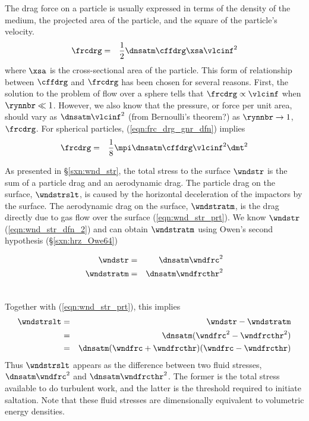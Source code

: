 \documentclass[12pt,twoside]{book}
\begin{document}
The drag force on a particle is usually expressed in terms of the
density of the medium, the projected area of the particle, and the
square of the particle's velocity.
\begin{eqnarray}
\frcdrg & = & \frac{1}{2} \dnsatm \cffdrg \xsa \vlcinf^{2}
\label{eqn:frc_drg_gnr_dfn}
\end{eqnarray}
where $\xsa$ is the cross-sectional area of the particle.
This form of relationship between $\cffdrg$ and $\frcdrg$ has been
chosen for several reasons. 
First, the solution to the problem of flow over a sphere tells that
$\frcdrg \propto \vlcinf$ when $\rynnbr \ll 1$.
However, we also know that the pressure, or force per unit area, 
should vary as $\dnsatm \vlcinf^{2}$ (from Bernoulli's theorem?)
as $\rynnbr \rightarrow 1$, $\frcdrg$.
For spherical particles, (\ref{eqn:frc_drg_gnr_dfn}) implies
\begin{eqnarray}
\frcdrg & = & \frac{1}{8} \mpi \dnsatm \cffdrg \vlcinf^{2} \dmt^{2}
\label{eqn:frc_drg_sph_dfn}
\end{eqnarray}

As presented in \S\ref{sxn:wnd_str}, the total stress to the surface
$\wndstr$ is the sum of a particle drag and an aerodynamic drag.
The particle drag on the surface, $\wndstrslt$, is caused by the
horizontal deceleration of the impactors by the surface.
The aerodynamic drag on the surface, $\wndstratm$, is the drag
directly due to gas flow over the surface (\ref{eqn:wnd_str_prt}).  
We know $\wndstr$ (\ref{eqn:wnd_str_dfn_2}) and can obtain
$\wndstratm$ using Owen's second hypothesis (\S\ref{sxn:hrz_Owe64}) 
\newline\parbox{6in}{ %
\begin{eqnarray*}
\wndstr & = & \dnsatm \wndfrc^{2} \\
\wndstratm & = & \dnsatm \wndfrcthr^{2}
\end{eqnarray*}
}\hfill %
\parbox{1cm}{\begin{eqnarray}\label{eqn:wnd_str_Whi79}\end{eqnarray}}\newline
Together with (\ref{eqn:wnd_str_prt}), this implies
\begin{eqnarray}
\wndstrslt & = & \wndstr - \wndstratm \nonumber \\
& = & \dnsatm ( \wndfrc^{2} - \wndfrcthr^{2} ) \nonumber \\
& = & \dnsatm ( \wndfrc + \wndfrcthr ) ( \wndfrc - \wndfrcthr )
\label{eqn:wnd_str_slt_Whi79_1}
\end{eqnarray}
Thus $\wndstrslt$ appears as the difference between two fluid
stresses, $\dnsatm \wndfrc^{2}$ and $\dnsatm \wndfrcthr^{2}$. 
The former is the total stress available to do turbulent work, 
and the latter is the threshold required to initiate saltation.
Note that these fluid stresses are dimensionally equivalent to
volumetric energy densities. 
\end{document}
